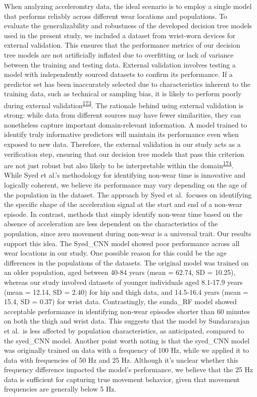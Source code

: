 \documentclass[
  10pt,
]{scrbook}
\begin{document}
When analyzing acceleromtry data, the ideal scenario is to employ a
single model that performs reliably across different wear locations and
populations. To evaluate the generalizability and robustness of the
developed decision tree models used in the present study, we included a
dataset from wrist-worn devices for external validation. This ensures
that the performance metrics of our decision tree models are not
artificially inflated due to overfitting or lack of variance between the
training and testing data. External validation involves testing a model
with independently sourced datasets to confirm its performance. If a
predictor set has been inaccurately selected due to characteristics
inherent to the training data, such as technical or sampling bias, it is
likely to perform poorly during external
validation\textsuperscript{\protect\hyperlink{ref-steyerberg_prediction_2016}{173}}.
The rationale behind using external validation is strong: while data
from different sources may have fewer similarities, they can nonetheless
capture important domain-relevant information. A model trained to
identify truly informative predictors will maintain its performance even
when exposed to new data. Therefore, the external validation in our
study acts as a verification step, ensuring that our decision tree
models that pass this criterion are not just robust but also likely to
be interpretable within the
domain\textsuperscript{\protect\hyperlink{ref-altman_prognosis_2009}{174}}.
While Syed et al.'s methodology for identifying non-wear time is
innovative and logically coherent, we believe its performance may vary
depending on the age of the population in the dataset. The approach by
Syed et al.~focuses on identifying the specific shape of the
acceleration signal at the start and end of a non-wear episode. In
contrast, methods that simply identify non-wear time based on the
absence of acceleration are less dependent on the characteristics of the
population, since zero movement during non-wear is a universal trait.
Our results support this idea. The Syed\_CNN model showed poor
performance across all wear locations in our study. One possible reason
for this could be the age differences in the populations of the
datasets. The original model was trained on an older population, aged
between 40-84 years (mean = 62.74, SD = 10.25), whereas our study
involved datasets of younger individuals aged 8.1-17.9 years (mean =
12.14, SD = 2.40) for hip and thigh data, and 14.5-16.4 years (mean =
15.4, SD = 0.37) for wrist data. Contrastingly, the sunda\_RF model
showed acceptable performance in identifying non-wear episodes shorter
than 60 minutes on both the thigh and wrist data. This suggests that the
model by Sundararajan et al.~is less affected by population
characteristics, as anticipated, compared to the syed\_CNN model.
Another point worth noting is that the syed\_CNN model was originally
trained on data with a frequency of 100 Hz, while we applied it to data
with frequencies of 50 Hz and 25 Hz. Although it's unclear whether this
frequency difference impacted the model's performance, we believe that
the 25 Hz data is sufficient for capturing true movement behavior, given
that movement frequencies are generally below 5 Hz.
\end{document}
